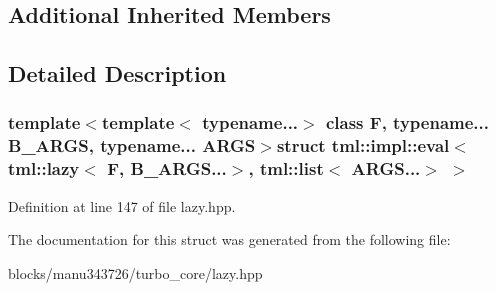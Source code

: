 \subsection*{Additional Inherited Members}


\subsection{Detailed Description}
\subsubsection*{template$<$template$<$ typename...$>$ class F, typename... B\+\_\+\+A\+R\+G\+S, typename... A\+R\+G\+S$>$struct tml\+::impl\+::eval$<$ tml\+::lazy$<$ F, B\+\_\+\+A\+R\+G\+S...$>$, tml\+::list$<$ A\+R\+G\+S...$>$ $>$}



Definition at line 147 of file lazy.\+hpp.



The documentation for this struct was generated from the following file\+:\begin{DoxyCompactItemize}
\item 
blocks/manu343726/turbo\+\_\+core/lazy.\+hpp\end{DoxyCompactItemize}
